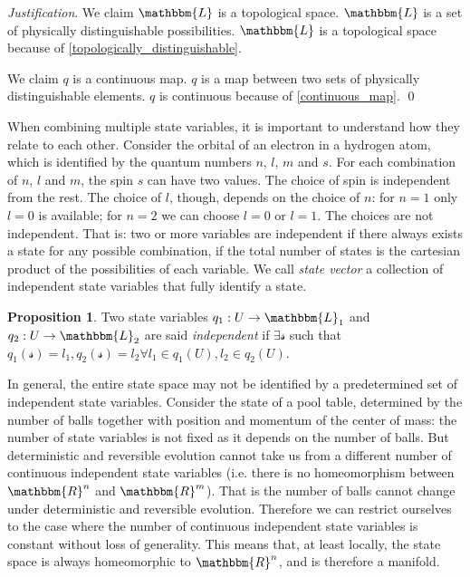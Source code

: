 \documentclass[aps,pra,10pt,twocolumn,floatfix,nofootinbib]{revtex4-1}
\numberwithin{equation}{section}
\theoremstyle{definition}
\newtheorem{prop}[equation]{Proposition}
\newenvironment{justification}{\emph{Justification}.}{\qed}
\begin{document}
\begin{justification}
	We claim $\mathbbm{L}$ is a topological space. $\mathbbm{L}$ is a set of physically distinguishable possibilities. $\mathbbm{L}$ is a topological space because of \ref{topologically_distinguishable}.
	
	We claim $q$ is a continuous map. $q$ is a map between two sets of physically distinguishable elements. $q$ is continuous because of \ref{continuous_map}.
\end{justification}

When combining multiple state variables, it is important to understand how they relate to each other. Consider the orbital of an electron in a hydrogen atom, which is identified by the quantum numbers $n$, $l$, $m$ and $s$. For each combination of $n$, $l$ and $m$, the spin $s$ can have two values. The choice of spin is independent from the rest. The choice of $l$, though, depends on the choice of $n$: for $n=1$ only $l=0$ is available; for $n=2$ we can choose $l=0$ or $l=1$. The choices are not independent. That is: two or more variables are independent if there always exists a state for any possible combination, if the total number of states is the cartesian product of the possibilities of each variable. We call \emph{state vector} a collection of independent state variables that fully identify a state.

\begin{prop}\label{independent_state_variables}
	Two state variables $q_1 : U \rightarrow \mathbbm{L}_1$ and $q_2 : U \rightarrow \mathbbm{L}_2$ are said \emph{independent} if $\exists \mathcal{s}$ such that $q_1(\mathcal{s})=l_1, q_2(\mathcal{s})=l_2 \forall l_1 \in q_1(U), l_2 \in q_2(U)$.
\end{prop}

In general, the entire state space may not be identified by a predetermined set of independent state variables. Consider the state of a pool table, determined by the number of balls together with position and momentum of the center of mass: the number of state variables is not fixed as it depends on the number of balls. But deterministic and reversible evolution cannot take us from a different number of continuous independent state variables (i.e. there is no homeomorphism between $\mathbbm{R}^n$ and $\mathbbm{R}^m$). That is the number of balls cannot change under deterministic and reversible evolution. Therefore we can restrict ourselves to the case where the number of continuous independent state variables is constant without loss of generality. This means that, at least locally, the state space is always homeomorphic to $\mathbbm{R}^n$, and is therefore a manifold.
\end{document}
